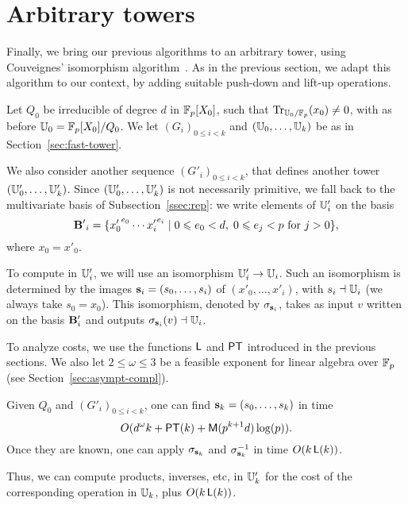 \section{Arbitrary towers}
\label{sec:couveignes-algorithm}

Finally, we bring our previous algorithms to an arbitrary tower, using
Couveignes' isomorphism algorithm~\cite{couveignes00}. As in the
previous section, we adapt this algorithm to our context, by adding
suitable push-down and lift-up operations.

Let $Q_0$ be irreducible of degree $d$ in $\mathbb{F}_p[X_0]$, such that
$\operatorname{Tr}_{\mathbb{U}_0/\mathbb{F}_p}(x_0)\ne0$, with as before
$\mathbb{U}_0=\mathbb{F}_p[X_0]/Q_0$. We let $(G_i)_{0 \le i < k}$ and
$(\mathbb{U}_0,\ldots,\mathbb{U}_k)$ be as in Section~\ref{sec:fast-tower}.

We also consider another sequence $(G'_i)_{0 \le i < k}$, that defines
another tower $(\mathbb{U}'_0,\ldots,\mathbb{U}'_k)$.  Since $(\mathbb{U}'_0,\ldots,\mathbb{U}'_k)$ is
not necessarily primitive, we fall back to the multivariate basis of
Subsection~\ref{ssec:rep}: we write elements of $\mathbb{U}'_i$ on the basis
  \begin{equation}
  \label{eq:58}
  \mathbf{B'}_i=
  \{{x'_0}^{e_0} \cdots {x'_i}^{e_i} \;|\; 0 \leqslant e_0 < d,\; 0\leqslant e_j < p 
  \text{ for $j>0$}\}
  \text{,}
\end{equation}
where $x_0=x'_0$.

To compute in $\mathbb{U}'_i$, we will use an isomorphism $\mathbb{U}'_i \rightarrow \mathbb{U}_i$.
Such an isomorphism is determined by the images
$\mathbf{s}_i=(s_0,\dots,s_i)$ of $(x'_0,\dots,x'_i)$, with $s_i \dashv
\mathbb{U}_i$ (we always take $s_0=x_0$). This isomorphism, denoted by
$\sigma_{\mathbf{s}_i}$, takes as input $v$ written on the basis
$\mathbf{B}'_i$ and outputs $\sigma_{\mathbf{s}_i}(v)\dashv \mathbb{U}_i$.

To analyze costs, we use the functions $\mathsf{L}$ and $\mathsf{PT}$ introduced
in the previous sections. We also let $2 \le \omega \le 3$ be a
feasible exponent for linear algebra over $\mathbb{F}_p$ (see
Section~\ref{sec:asympt-compl}).
\begin{theorem}\label{theo:main}
  Given $Q_0$ and $(G'_i)_{0 \le i < k}$, one can find
  $\mathbf{s}_k=(s_0,\dots,s_k)$ in time 
  \begin{equation}
    \label{eq:105}
    O(d^\omega k + \mathsf{PT}(k) +
    \mathsf{M}(p^{k+1} d) \log(p))
    \text{.}
  \end{equation}
  Once they are known, one can apply
  $\sigma_{\mathbf{s}_k}$ and $\sigma_{\mathbf{s}_k}^{-1}$ in time $O(k\,
  \mathsf{L}(k))$.
\end{theorem}
Thus, we can compute products, inverses, etc, in $\mathbb{U}'_k$ for
the cost of the corresponding operation in $\mathbb{U}_k$, plus $O(k\,
\mathsf{L}(k))$.

